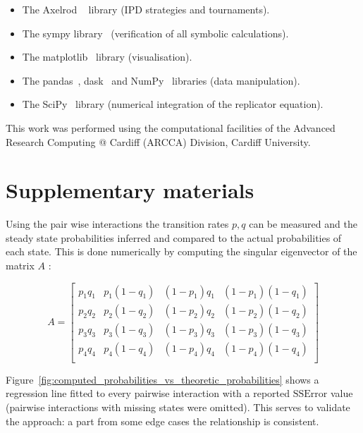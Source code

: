 \documentclass[a4paper]{article}
\begin{document}
\begin{itemize}
    \item The Axelrod ~\cite{Knight2016, Knight2018} library (IPD strategies and
        tournaments).
    \item The sympy library~\cite{Meurer2017} (verification of all symbolic
        calculations).
    \item The matplotlib~\cite{Droettboom2018} library (visualisation).
    \item The pandas~\cite{Structures2010}, dask~\cite{Dask2016} and
        NumPy~\cite{Oliphant2015} libraries (data manipulation).
    \item The SciPy~\cite{Jones2001} library (numerical integration of the
        replicator equation).
\end{itemize}

This work was performed using the computational facilities of the Advanced
Research Computing @ Cardiff (ARCCA) Division, Cardiff University.

\printbibliography

\newpage
\section*{Supplementary materials}



\newpage

Using the pair wise interactions the transition rates \(p,
q\) can be measured and the steady state probabilities inferred and compared to
the actual probabilities of each state.
This is done numerically by computing the singular eigenvector of the
matrix \(A\) \cite{Stewart2009}:

\[
    A =
    \begin{bmatrix}
        p_1 q_1 & p_1 (1 - q_1) & (1 - p_1) q_1 & (1 -p_1) (1 - q_1) \\
        p_2 q_2 & p_2 (1 - q_2) & (1 - p_2) q_2 & (1 -p_2) (1 - q_2) \\
        p_3 q_3 & p_3 (1 - q_3) & (1 - p_3) q_3 & (1 -p_3) (1 - q_3) \\
        p_4 q_4 & p_4 (1 - q_4) & (1 - p_4) q_4 & (1 -p_4) (1 - q_4) \\
    \end{bmatrix}
\]

Figure~\ref{fig:computed_probabilities_vs_theoretic_probabilities} shows a
regression line fitted to every pairwise interaction with a reported
\(\text{SSError}\) value (pairwise interactions with missing states were
omitted). This serves to validate the approach: a part from some edge cases the
relationship is consistent.
\end{document}
